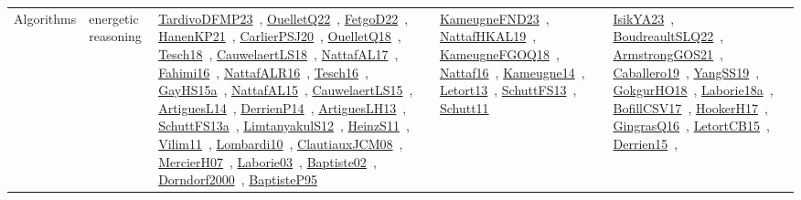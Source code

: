 {\begin{longtable}{lp{3cm}>{\raggedright\arraybackslash}p{6cm}>{\raggedright\arraybackslash}p{6cm}>{\raggedright\arraybackslash}p{8cm}}
\index{energetic reasoning}\index{Algorithms!energetic reasoning}Algorithms & energetic reasoning & \href{../works/TardivoDFMP23.pdf}{TardivoDFMP23}~\cite{TardivoDFMP23}, \href{../works/OuelletQ22.pdf}{OuelletQ22}~\cite{OuelletQ22}, \href{../works/FetgoD22.pdf}{FetgoD22}~\cite{FetgoD22}, \href{../works/HanenKP21.pdf}{HanenKP21}~\cite{HanenKP21}, \href{../works/CarlierPSJ20.pdf}{CarlierPSJ20}~\cite{CarlierPSJ20}, \href{../works/OuelletQ18.pdf}{OuelletQ18}~\cite{OuelletQ18}, \href{../works/Tesch18.pdf}{Tesch18}~\cite{Tesch18}, \href{../works/CauwelaertLS18.pdf}{CauwelaertLS18}~\cite{CauwelaertLS18}, \href{../works/NattafAL17.pdf}{NattafAL17}~\cite{NattafAL17}, \href{../works/Fahimi16.pdf}{Fahimi16}~\cite{Fahimi16}, \href{../works/NattafALR16.pdf}{NattafALR16}~\cite{NattafALR16}, \href{../works/Tesch16.pdf}{Tesch16}~\cite{Tesch16}, \href{../works/GayHS15a.pdf}{GayHS15a}~\cite{GayHS15a}, \href{../works/NattafAL15.pdf}{NattafAL15}~\cite{NattafAL15}, \href{../works/CauwelaertLS15.pdf}{CauwelaertLS15}~\cite{CauwelaertLS15}, \href{../works/ArtiguesL14.pdf}{ArtiguesL14}~\cite{ArtiguesL14}, \href{../works/DerrienP14.pdf}{DerrienP14}~\cite{DerrienP14}, \href{../works/ArtiguesLH13.pdf}{ArtiguesLH13}~\cite{ArtiguesLH13}, \href{../works/SchuttFS13a.pdf}{SchuttFS13a}~\cite{SchuttFS13a}, \href{../works/LimtanyakulS12.pdf}{LimtanyakulS12}~\cite{LimtanyakulS12}, \href{../works/HeinzS11.pdf}{HeinzS11}~\cite{HeinzS11}, \href{../works/Vilim11.pdf}{Vilim11}~\cite{Vilim11}, \href{../works/Lombardi10.pdf}{Lombardi10}~\cite{Lombardi10}, \href{../works/ClautiauxJCM08.pdf}{ClautiauxJCM08}~\cite{ClautiauxJCM08}, \href{../works/MercierH07.pdf}{MercierH07}~\cite{MercierH07}, \href{../works/Laborie03.pdf}{Laborie03}~\cite{Laborie03}, \href{../works/Baptiste02.pdf}{Baptiste02}~\cite{Baptiste02}, \href{../works/Dorndorf2000.pdf}{Dorndorf2000}~\cite{Dorndorf2000}, \href{../works/BaptisteP95.pdf}{BaptisteP95}~\cite{BaptisteP95} & \href{../works/KameugneFND23.pdf}{KameugneFND23}~\cite{KameugneFND23}, \href{../works/NattafHKAL19.pdf}{NattafHKAL19}~\cite{NattafHKAL19}, \href{../works/KameugneFGOQ18.pdf}{KameugneFGOQ18}~\cite{KameugneFGOQ18}, \href{../works/Nattaf16.pdf}{Nattaf16}~\cite{Nattaf16}, \href{../works/Kameugne14.pdf}{Kameugne14}~\cite{Kameugne14}, \href{../works/Letort13.pdf}{Letort13}~\cite{Letort13}, \href{../works/SchuttFS13.pdf}{SchuttFS13}~\cite{SchuttFS13}, \href{../works/Schutt11.pdf}{Schutt11}~\cite{Schutt11} & \href{../works/IsikYA23.pdf}{IsikYA23}~\cite{IsikYA23}, \href{../works/BoudreaultSLQ22.pdf}{BoudreaultSLQ22}~\cite{BoudreaultSLQ22}, \href{../works/ArmstrongGOS21.pdf}{ArmstrongGOS21}~\cite{ArmstrongGOS21}, \href{../works/Caballero19.pdf}{Caballero19}~\cite{Caballero19}, \href{../works/YangSS19.pdf}{YangSS19}~\cite{YangSS19}, \href{../works/GokgurHO18.pdf}{GokgurHO18}~\cite{GokgurHO18}, \href{../works/Laborie18a.pdf}{Laborie18a}~\cite{Laborie18a}, \href{../works/BofillCSV17.pdf}{BofillCSV17}~\cite{BofillCSV17}, \href{../works/HookerH17.pdf}{HookerH17}~\cite{HookerH17}, \href{../works/GingrasQ16.pdf}{GingrasQ16}~\cite{GingrasQ16}, \href{../works/LetortCB15.pdf}{LetortCB15}~\cite{LetortCB15}, \href{../works/Derrien15.pdf}{Derrien15}~\cite{Derrien15}, 
\end{longtable}}
